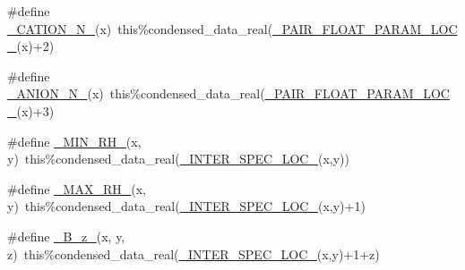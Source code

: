 \begin{DoxyCompactItemize}
\item 
\#define \mbox{\hyperlink{rxn___p_d_fi_t_e__activity_8_f90_ad506f5976c67c7c5f6d9fbbdd4c418aa}{\+\_\+\+C\+A\+T\+I\+O\+N\+\_\+\+N\+\_\+}}(x)~this\%condensed\+\_\+data\+\_\+real(\mbox{\hyperlink{rxn___z_s_r__aerosol__water_8c_a870d0d577e7b4aa4f6ff26a97bef9a71}{\+\_\+\+P\+A\+I\+R\+\_\+\+F\+L\+O\+A\+T\+\_\+\+P\+A\+R\+A\+M\+\_\+\+L\+O\+C\+\_\+}}(x)+2)
\item 
\#define \mbox{\hyperlink{rxn___p_d_fi_t_e__activity_8_f90_a540e38a308f8dae21ceb7f21a9d4aa97}{\+\_\+\+A\+N\+I\+O\+N\+\_\+\+N\+\_\+}}(x)~this\%condensed\+\_\+data\+\_\+real(\mbox{\hyperlink{rxn___z_s_r__aerosol__water_8c_a870d0d577e7b4aa4f6ff26a97bef9a71}{\+\_\+\+P\+A\+I\+R\+\_\+\+F\+L\+O\+A\+T\+\_\+\+P\+A\+R\+A\+M\+\_\+\+L\+O\+C\+\_\+}}(x)+3)
\item 
\#define \mbox{\hyperlink{rxn___p_d_fi_t_e__activity_8_f90_ab72d1cce0333d0c2cf06502bc74add66}{\+\_\+\+M\+I\+N\+\_\+\+R\+H\+\_\+}}(x,  y)~this\%condensed\+\_\+data\+\_\+real(\mbox{\hyperlink{rxn___p_d_fi_t_e__activity_8_f90_a09165951795c5df7b6ba8d81e3b9d43c}{\+\_\+\+I\+N\+T\+E\+R\+\_\+\+S\+P\+E\+C\+\_\+\+L\+O\+C\+\_\+}}(x,y))
\item 
\#define \mbox{\hyperlink{rxn___p_d_fi_t_e__activity_8_f90_a4d44c27077f356c34291feadc52b6520}{\+\_\+\+M\+A\+X\+\_\+\+R\+H\+\_\+}}(x,  y)~this\%condensed\+\_\+data\+\_\+real(\mbox{\hyperlink{rxn___p_d_fi_t_e__activity_8_f90_a09165951795c5df7b6ba8d81e3b9d43c}{\+\_\+\+I\+N\+T\+E\+R\+\_\+\+S\+P\+E\+C\+\_\+\+L\+O\+C\+\_\+}}(x,y)+1)
\item 
\#define \mbox{\hyperlink{rxn___p_d_fi_t_e__activity_8_f90_acc34fabbff83646fe9437a040ecf8696}{\+\_\+\+B\+\_\+z\+\_\+}}(x,  y,  z)~this\%condensed\+\_\+data\+\_\+real(\mbox{\hyperlink{rxn___p_d_fi_t_e__activity_8_f90_a09165951795c5df7b6ba8d81e3b9d43c}{\+\_\+\+I\+N\+T\+E\+R\+\_\+\+S\+P\+E\+C\+\_\+\+L\+O\+C\+\_\+}}(x,y)+1+z)
\end{DoxyCompactItemize}
